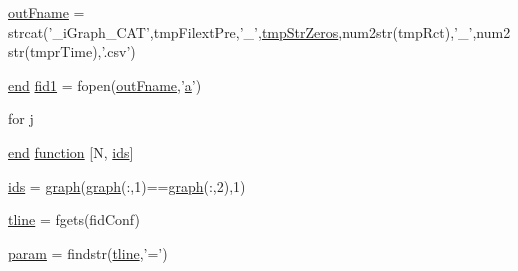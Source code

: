 \begin{DoxyCompactItemize}
\item 
\hyperlink{a00028_abf4ae8c34e865742e8ee979ed6e03384}{out\-Fname} = strcat('\-\_\-i\-Graph\-\_\-\-C\-A\-T',tmp\-Filext\-Pre,'\-\_\-',\hyperlink{a00028_aacf946bee61c4c535a7bf6d85f55f66a}{tmp\-Str\-Zeros},num2str(tmp\-Rct),'\-\_\-',num2str(tmpr\-Time),'.csv')
\item 
\hyperlink{a00025_afb358f48b1646c750fb9da6c6585be2b}{end} \hyperlink{a00028_ae941ef58ebac7f05a8095badde51c07b}{fid1} = fopen(\hyperlink{a00028_abf4ae8c34e865742e8ee979ed6e03384}{out\-Fname},'\hyperlink{a00035_a2ffdbad9ea59541e59cbd2b938e0770c}{a}')
\item 
for \hyperlink{a00028_ad34e9c7e9ae69ae0b9f1866faed5e4ad}{j}
\item 
\hyperlink{a00025_afb358f48b1646c750fb9da6c6585be2b}{end} \hyperlink{a00028_af12e4ac3392d0671e386d46e2424a06a}{function} \mbox{[}N, \hyperlink{a00028_a0a9b879f29cc1e1e03ffc7851f7c19b9}{ids}\mbox{]}
\item 
\hyperlink{a00028_a0a9b879f29cc1e1e03ffc7851f7c19b9}{ids} = \hyperlink{a00028_a2745e24fec2a44d51f4452beb1596bd3}{graph}(\hyperlink{a00028_a2745e24fec2a44d51f4452beb1596bd3}{graph}(\-:,1)==\hyperlink{a00028_a2745e24fec2a44d51f4452beb1596bd3}{graph}(\-:,2),1)
\item 
\hyperlink{a00028_a6791897869706b835f1a5d305739a415}{tline} = fgets(fid\-Conf)
\item 
\hyperlink{a00028_a51f20d6b1b54a2eee3be0e8adc96a0ae}{param} = findstr(\hyperlink{a00033_a6791897869706b835f1a5d305739a415}{tline},'=')
\end{DoxyCompactItemize}


